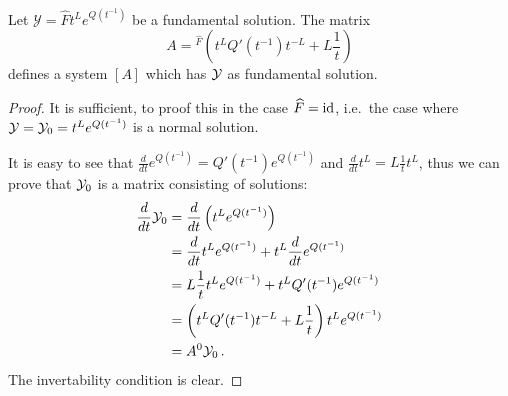 \begin{prop}\label{prop:fundSolBuilder}
  Let $\mathcal{Y}=\hat F t^L e^{Q(t^{-1})}$ be a fundamental solution.
  The matrix
  \[
    A={}^{\hat F}\left(t^LQ'(t^{-1})t^{-L}+L\frac{1}{t}\right)
  \]
  defines a system $[A]$ which has $\mathcal{Y}$ as fundamental solution.
\end{prop}
\begin{proof}
  It is sufficient, to proof this in the case $\widehat F=\operatorname{id}$, i.e.\ the case
  where $\mathcal{Y}=\mathcal{Y}_0=t^L e^{Q(t^{-1})}$ is a normal solution.

  \begin{comment}
    Since we are dealing with diagonal matrices it is easy to see that
    \begin{align*}
      \frac{d}{dt}e^{Q(t^{-1})}
      &=\diag\left(\frac{d}{dt}e^{q_1(t^{-1})},\frac{d}{dt}e^{q_2(t^{-1})}
        ,\dots,
        \frac{d}{dt}e^{q_n(t^{-1})}\right)
        \\&=\diag\left(\frac{d}{dt}q_1(t^{-1})e^{q_1(t^{-1})}
                      ,\frac{d}{dt}q_1(t^{-1})e^{q_2(t^{-1})}
                      ,\dots
                      ,\frac{d}{dt}q_1(t^{-1})e^{q_n(t^{-1})}\right)
    \\&=Q'(t^{-1})e^{Q(t^{-1})} \,.
    \end{align*}
    and, since the function $t^L$ is defined as $e^{L\ln t}$,
    \begin{align*}
      \frac{d}{dt}t^L&=\frac{d}{dt}e^{L\ln t}
      =Le^{(L-\id)\ln t}
      =L\frac{1}{t}t^L \,.
    \end{align*}
  \end{comment}
  It is easy to see that $\frac{d}{dt}e^{Q(t^{-1})}=Q'(t^{-1})e^{Q(t^{-1})}$
  and $\frac{d}{dt}t^L=L\frac{1}{t}t^L$, thus we can prove that $\mathcal{Y}_0$ is a
  matrix consisting of solutions:
  \begin{align*}
    \frac{d}{dt}\mathcal{Y}_0
    &=\frac{d}{dt}\left(t^Le^{Q(t^{-1})}\right)
  \\&=\frac{d}{dt}t^Le^{Q(t^{-1})}+t^L\frac{d}{dt}e^{Q(t^{-1})}
  \\&=L\frac{1}{t}t^Le^{Q(t^{-1})}+t^LQ'(t^{-1})e^{Q(t^{-1})}
  \\&=\left(t^LQ'(t^{-1})t^{-L}+L\frac{1}{t}\right)t^Le^{Q(t^{-1})}
  \\&=A^0\mathcal{Y}_0 \,.
  \end{align*}
  The invertability condition is clear.
\end{proof}
